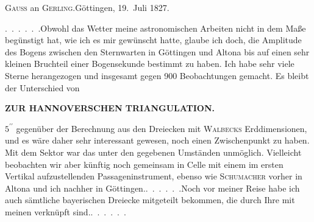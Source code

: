 \begin{center}
\textsc{Gauss} an \textsc{Gerling}.\quad Göttingen, 19.~Juli 1827.
\end{center}

\par\noindent\hspace*{\parindent}\mbox{.\ .\ .\ .\ .\ .}\quad Obwohl das Wetter meine astronomischen Arbeiten nicht in
dem Maße begünstigt hat, wie ich es mir gewünscht hatte, glaube ich
doch, die Amplitude des Bogens zwischen den Sternwarten in Göttingen
und Altona bis auf einen sehr kleinen Bruchteil einer Bogensekunde bestimmt zu
haben. Ich habe sehr viele Sterne herangezogen und
insgesamt gegen 900 Beobachtungen gemacht. Es bleibt der Unterschied von
\par\clearpage
\noindent\null\hfill{\small\textbf{ZUR HANNOVERSCHEN TRIANGULATION.}}\hfill{}\par\medskip
\noindent \(5^{\prime\prime}\) gegenüber der Berechnung aus den Dreiecken mit \textsc{Walbecks} Erddimensionen,
und es wäre daher sehr interessant gewesen, noch einen Zwischenpunkt zu
haben. Mit dem Sektor war das unter den gegebenen Umständen unmöglich.
Vielleicht beobachten wir aber künftig noch gemeinsam in Celle mit einem im ersten Vertikal
aufzustellenden Passageninstrument, ebenso wie \textsc{Schumacher}
vorher in Altona und ich nachher in \mbox{Göttingen.\quad\mbox{.\ .\ .\ .\ .\ .}}\quad Noch vor meiner
Reise habe ich auch sämtliche bayerischen Dreiecke mitgeteilt
bekommen, die durch Ihre mit meinen verknüpft \mbox{sind.\quad\mbox{.\ .\ .\ .\ .\ .}}
\par
